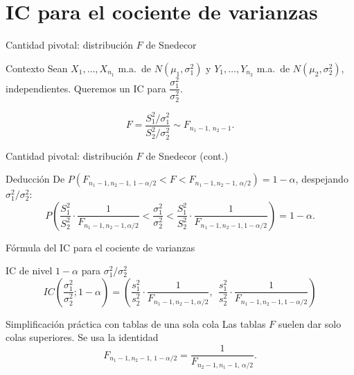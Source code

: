 \documentclass[aspectratio=169,11pt]{beamer}
\begin{document}
\section{IC para el cociente de varianzas}

\begin{frame}{Cantidad pivotal: distribución $F$ de Snedecor}
\begin{block}{Contexto}
Sean $X_1,\dots,X_{n_1}$ m.a.\ de $N(\mu_1,\sigma_1^2)$ y $Y_1,\dots,Y_{n_2}$ m.a.\ de $N(\mu_2,\sigma_2^2)$, independientes. Queremos un IC para $\dfrac{\sigma_1^2}{\sigma_2^2}$.
\end{block}

\begin{theorem}
\[
F = \frac{S_1^2/\sigma_1^2}{S_2^2/\sigma_2^2} \sim F_{n_1-1,\,n_2-1}.
\]
\end{theorem}

\end{frame}

\begin{frame}{Cantidad pivotal: distribución $F$ de Snedecor (cont.)}
\begin{block}{Deducción}
De $P(F_{n_1-1,n_2-1,\,1-\alpha/2} < F < F_{n_1-1,n_2-1,\,\alpha/2}) = 1-\alpha$, despejando $\sigma_1^2/\sigma_2^2$:
\[
P\left(\frac{S_1^2}{S_2^2}\cdot\frac{1}{F_{n_1-1,n_2-1,\alpha/2}} < \frac{\sigma_1^2}{\sigma_2^2} < \frac{S_1^2}{S_2^2}\cdot\frac{1}{F_{n_1-1,n_2-1,1-\alpha/2}}\right)=1-\alpha.
\]
\end{block}
\end{frame}

\begin{frame}{Fórmula del IC para el cociente de varianzas}
\begin{alertblock}{IC de nivel $1-\alpha$ para $\sigma_1^2/\sigma_2^2$}
\[
IC\left(\frac{\sigma_1^2}{\sigma_2^2};1-\alpha\right) = \left(\frac{s_1^2}{s_2^2}\cdot\frac{1}{F_{n_1-1,n_2-1,\alpha/2}},\ \ \frac{s_1^2}{s_2^2}\cdot\frac{1}{F_{n_1-1,n_2-1,1-\alpha/2}}\right)
\]
\end{alertblock}

\begin{block}{Simplificación práctica con tablas de una sola cola}
Las tablas $F$ suelen dar solo colas superiores. Se usa la identidad
\[
F_{n_1-1,n_2-1,\,1-\alpha/2} = \frac{1}{F_{n_2-1,n_1-1,\,\alpha/2}}.
\]
\end{block}

\end{frame}
\end{document}
